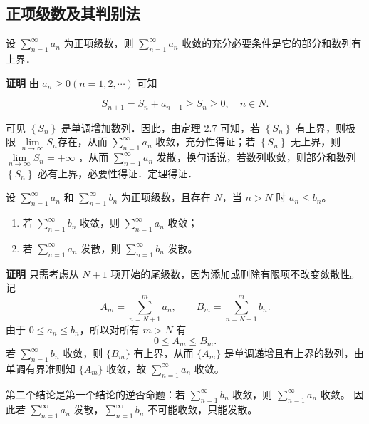 \documentclass[fontset=fandol]{ctexart}
\newenvironment{custom}[1]{\par\noindent\textbf{#1}\quad}{\par\vspace{0.8em}}
\begin{document}
\subsection{正项级数及其判别法}

\begin{theorem}
	设 $\sum\limits_{n = 1}^{  \infty } a_n$ 为正项级数，则 $\sum\limits_{n = 1}^{  \infty }a_n$ 收敛的充分必要条件是它的部分和数列有上界．
\end{theorem}


\begin{custom}{证明}
由 $a_n \geqslant 0(n=1,2, \cdots)$ 可知

$$
S_{n+1}=S_n+a_{n+1} \geqslant S_n \geqslant 0, \quad n \in N .
$$

可见 $\left\{S_n\right\}$ 是单调增加数列．因此，由定理 2.7 可知，若 $\left\{S_n\right\}$ 有上界，则极限 $\lim \limits_{n \to \infty} S_n$存在，从而 $\sum\limits_{n = 1}^{  \infty } a_n$ 收敛，充分性得证；若 $\left\{S_n\right\}$ 无上界，则 $\lim \limits_{n \to \infty} S_n=+\infty$ ，从而 $\sum\limits_{n = 1}^{  \infty } a_n$ 发散，换句话说，若数列收敛，则部分和数列 $\left\{S_n\right\}$ 必有上界，必要性得证．定理得证．

\end{custom}

\begin{theorem}[比较判别法]
设 \(\sum\limits_{n = 1}^{  \infty } a_n\) 和 \(\sum\limits_{n = 1}^{  \infty } b_n\) 为正项级数，且存在 \(N\)，当 \(n > N\) 时 \(a_n \leq b_n\)。
\begin{enumerate}
\item 若 \(\sum\limits_{n = 1}^{  \infty } b_n\) 收敛，则 \(\sum\limits_{n = 1}^{  \infty } a_n\) 收敛；
\item 若 \(\sum\limits_{n = 1}^{  \infty } a_n\) 发散，则 \(\sum\limits_{n = 1}^{  \infty } b_n\) 发散。
\end{enumerate}
\end{theorem}

\begin{custom}{证明}
只需考虑从 $N+1$ 项开始的尾级数，因为添加或删除有限项不改变敛散性。 记
\[
A_m=\sum_{n=N+1}^{m}a_n,\qquad B_m=\sum_{n=N+1}^{m}b_n.
\]
由于 $0\le a_n\le b_n$，所以对所有 $m>N$ 有
\[
0\le A_m\le B_m.
\]
若 $\sum\limits_{n = 1}^{  \infty } b_n$ 收敛，则 $\{B_m\}$ 有上界，从而 $\{A_m\}$ 是单调递增且有上界的数列，由单调有界准则知 $\{A_m\}$ 收敛，故 $\sum\limits_{n = 1}^{  \infty } a_n$ 收敛。

第二个结论是第一个结论的逆否命题：若 $\sum\limits_{n = 1}^{  \infty } b_n$ 收敛，则 $\sum\limits_{n = 1}^{  \infty } a_n$ 收敛。 因此若 $\sum\limits_{n = 1}^{  \infty } a_n$ 发散，$\sum\limits_{n = 1}^{  \infty } b_n$ 不可能收敛，只能发散。
\end{custom}
\end{document}
